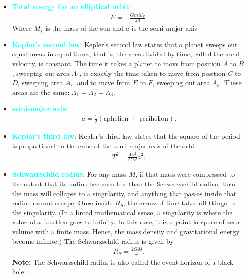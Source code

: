 \documentclass{report}
\begin{document}
\begin{itemize}
        \item \textbf{\textcolor{cyan}{Total energy for an elliptical orbit}}:
            \begin{align*}
                E = -\frac{GmM_{S}}{2a}
            .\end{align*}
            Where $M_{s}$ is the mass of the sun and $a$ is the semi-major axis
    \item \textbf{\textcolor{cyan}{Keplar's second law}}:
        Kepler’s second law states that a planet sweeps out equal areas in equal times, that is, the area divided by time, called the areal velocity, is constant.
        \bigbreak \noindent 
        \bigbreak \noindent 
        The time it takes a planet to move from position \(A\) to \(B\), sweeping out area \(A_1\), is exactly the time taken to move from position \(C\) to \(D\), sweeping area \(A_2\), and to move from \(E\) to \(F\), sweeping out area \(A_3\). These areas are the same: \(A_1 = A_2 = A_3\).
    \item \textbf{\textcolor{cyan}{semi-major axis}}:
        \begin{align*}
            a = \frac{1}{2}(\text{aphelion}\, + \, \text{perihelion})
        .\end{align*}
    \item \textbf{\textcolor{cyan}{Keplar's third law}}: Kepler’s third law states that the square of the period is proportional to the cube of the semi-major axis of the orbit. 
        \begin{align*}
            T^{2} = \frac{4\pi^{2}}{GM}a^{3}            
        .\end{align*}
    \item \textbf{\textcolor{cyan}{Schwarzschild radius}}:
        For any mass $M$, if that mass were compressed to the extent that its radius becomes less than the Schwarzschild radius, then the mass will collapse to a singularity, and anything that passes inside that radius cannot escape. Once inside $R_{S}$, the arrow of time takes all things to the singularity. (In a broad mathematical sense, a singularity is where the value of a function goes to infinity. In this case, it is a point in space of zero volume with a finite mass. Hence, the mass density and gravitational energy become infinite.) The Schwarzschild radius is given by
        \begin{align*}
            R_{S} = \frac{2GM}{c^{2}}
        .\end{align*}
        \bigbreak \noindent 
        \textbf{Note:} The Schwarzschild radius is also called the event horizon of a black hole.
    \end{itemize}
\end{document}
